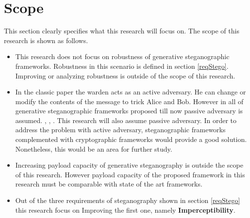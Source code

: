 \documentclass[../main/main.tex]{subfiles}
\begin{document}
	
	\section{Scope}
	This section clearly specifies what this research will focus on. The scope of this research is shown as follows.
	
	\begin{itemize}
		\item This research does not focus on robustness of generative steganographic frameworks. Robustness in this scenario is defined in section \ref{reqStego}. Improving or analyzing robustness is outside of the scope of this research.
		
		\item In the classic paper \cite{simmons1984prisoners} the warden acts as an active adversary. He can change or modify the contents of the message to trick Alice and Bob. However in all of generative steganographic frameworks proposed till now passive adversary is assumed. \cite{Hu2018}, \cite{Zhang2019}, \cite{Ke}. This research will also assume passive adversary. In order to address the problem with active adversary, steganographic frameworks complemented with  cryptographic frameworks would provide a good solution. Nonetheless, this would be an area for further study.
		
		\item Increasing payload capacity of generative steganography is outside the scope of this research. However payload capacity of the proposed framework in this research must be comparable with state of the art frameworks. 
		
		\item Out of the three requirements of steganography shown in section \ref{reqStego} this research focus on Improving the first one, namely \textbf{Imperceptibility}.
	\end{itemize}
\end{document}
